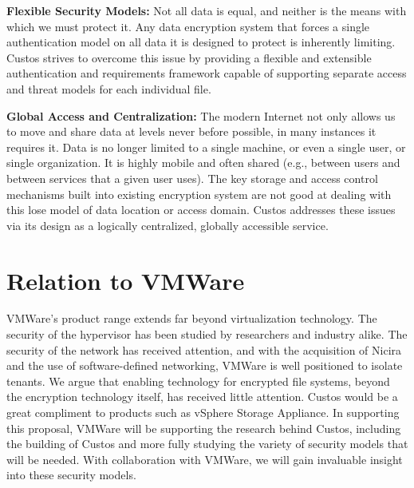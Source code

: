\noindent
\textbf{Flexible Security Models:}
Not all data is equal, and neither is the means with which we must
protect it. Any data
encryption system that forces a single authentication model on all
data it is designed to protect is inherently limiting.
Custos strives to overcome this issue by providing a flexible and
extensible authentication and requirements framework capable of
supporting separate access and threat models for each individual
file. 

\noindent
\textbf{Global Access and Centralization:}
The modern Internet not only allows us to move and share data at
levels never before possible, in many instances it requires it. Data
is no longer limited to a single machine, or even a single user, or single
organization. It is highly mobile and often shared (e.g., between users and between
services that a given user uses). The key storage and access control mechanisms
built into existing encryption system are not good at dealing with
this lose model of data location or access domain.
Custos addresses these issues via its design as a logically
centralized, globally accessible service.



\section{Relation to VMWare}

VMWare's product range extends far beyond virtualization technology.
The security of the hypervisor has been studied by researchers and 
industry alike.  The security of the
network has received attention, and with the acquisition of Nicira and 
the use of software-defined networking, VMWare is well positioned to
isolate tenants.  We argue that enabling technology for encrypted file systems,
beyond the encryption technology itself, has received little attention.
Custos would be a great compliment to products such as vSphere Storage 
Appliance.  In supporting this proposal, VMWare will be supporting 
the research behind Custos, including the building of Custos and 
more fully studying the variety of security models that will be
needed.  With collaboration with VMWare, we will gain invaluable 
insight into these security models.
